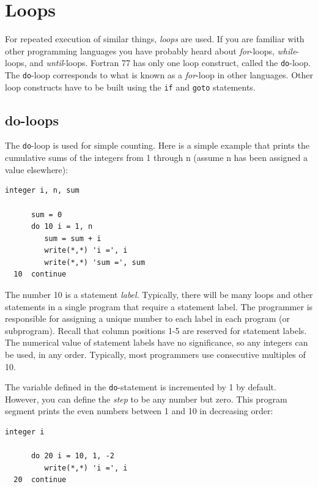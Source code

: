 \chapter{Loops}

For repeated execution of similar things, \emph{loops} are used. If you are familiar with other programming languages you have probably heard about \emph{for}-loops, \emph{while}-loops, and \emph{until}-loops. Fortran 77 has only one loop construct, called the \texttt{do}-loop. The \texttt{do}-loop corresponds to what is known as a \emph{for}-loop in other languages. Other loop constructs have to be built using the \texttt{if} and \texttt{goto} statements.

\section{do-loops}

The \texttt{do}-loop is used for simple counting. Here is a simple example that prints the cumulative sums of the integers from 1 through n (assume n has been assigned a value elsewhere):

\begin{lstlisting}[style=fortran77]
      integer i, n, sum
 
      sum = 0
      do 10 i = 1, n
         sum = sum + i
         write(*,*) 'i =', i
         write(*,*) 'sum =', sum
  10  continue
\end{lstlisting}

The number 10 is a statement \emph{label}. Typically, there will be many loops and other statements in a single program that require a statement label. The programmer is responsible for assigning a unique number to each label in each program (or subprogram). Recall that column positions 1-5 are reserved for statement labels. The numerical value of statement labels have no significance, so any integers can be used, in any order. Typically, most programmers use consecutive multiples of 10.

The variable defined in the \texttt{do}-statement is incremented by 1 by default. However, you can define the \emph{step} to be any number but zero. This program segment prints the even numbers between 1 and 10 in decreasing order:

\begin{lstlisting}[style=fortran77]
      integer i
 
      do 20 i = 10, 1, -2
         write(*,*) 'i =', i
  20  continue
\end{lstlisting}

